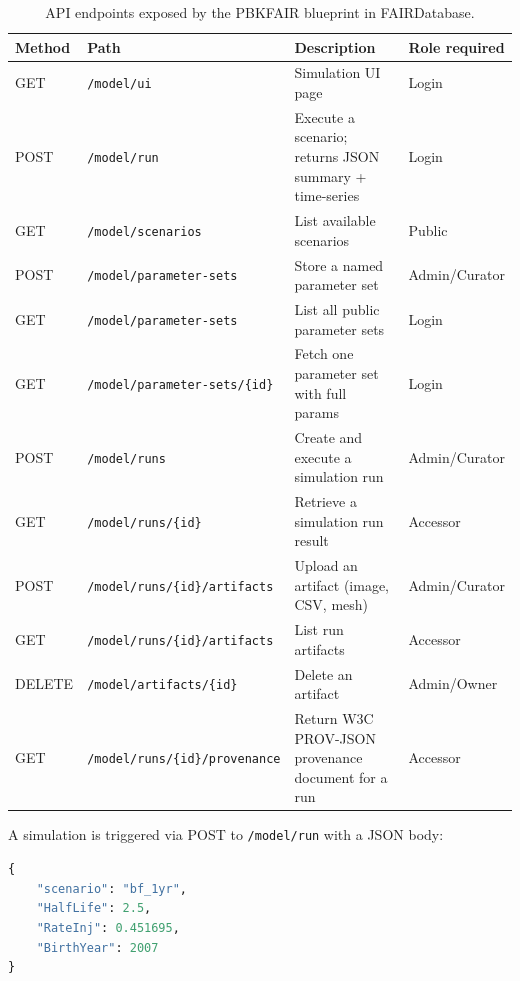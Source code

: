 \documentclass[12pt]{article}
\begin{document}
\begin{table}[h]
\centering
\caption{API endpoints exposed by the PBKFAIR blueprint in FAIRDatabase.}
\label{tab:api}
\begin{tabular}{p{1.2cm} p{5.5cm} p{5.5cm} p{2cm}}
\toprule
\textbf{Method} & \textbf{Path} & \textbf{Description} &
\textbf{Role required} \\
\midrule
GET  & \texttt{/model/ui}
     & Simulation UI page
     & Login \\
POST & \texttt{/model/run}
     & Execute a scenario; returns JSON summary + time-series
     & Login \\
GET  & \texttt{/model/scenarios}
     & List available scenarios
     & Public \\
POST & \texttt{/model/parameter-sets}
     & Store a named parameter set
     & Admin/Curator \\
GET  & \texttt{/model/parameter-sets}
     & List all public parameter sets
     & Login \\
GET  & \texttt{/model/parameter-sets/\{id\}}
     & Fetch one parameter set with full params
     & Login \\
POST & \texttt{/model/runs}
     & Create and execute a simulation run
     & Admin/Curator \\
GET  & \texttt{/model/runs/\{id\}}
     & Retrieve a simulation run result
     & Accessor \\
POST & \texttt{/model/runs/\{id\}/artifacts}
     & Upload an artifact (image, CSV, mesh)
     & Admin/Curator \\
GET  & \texttt{/model/runs/\{id\}/artifacts}
     & List run artifacts
     & Accessor \\
DELETE & \texttt{/model/artifacts/\{id\}}
       & Delete an artifact
       & Admin/Owner \\
GET  & \texttt{/model/runs/\{id\}/provenance}
     & Return W3C PROV-JSON provenance document for a run
     & Accessor \\
\bottomrule
\end{tabular}
\end{table}

A simulation is triggered via POST to \texttt{/model/run} with a JSON
body:
\begin{lstlisting}[language=Python, caption={Example POST request body
for /model/run}]
{
    "scenario": "bf_1yr",
    "HalfLife": 2.5,
    "RateInj": 0.451695,
    "BirthYear": 2007
}
\end{lstlisting}

\end{document}
